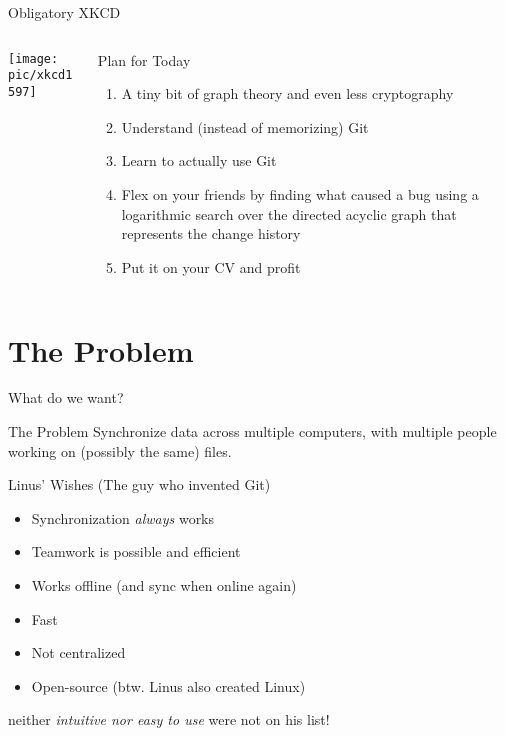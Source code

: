 \documentclass[xetex]{beamer}
\begin{document}
\begin{frame}{Obligatory XKCD}
  \begin{columns}
    \begin{column}{.5\linewidth}
      \texttt{[image: pic/xkcd1597]}
    \end{column}
    \begin{column}{.5\linewidth}
      \begin{alertblock}{Plan for Today}
        \begin{enumerate}
          \item A tiny bit of graph theory and even less cryptography
          \item Understand (instead of memorizing) Git
          \item Learn to actually use Git
          \item Flex on your friends by finding what caused a bug using a
            logarithmic search over the directed acyclic graph that represents
            the change history
          \item Put it on your CV and profit
        \end{enumerate}
      \end{alertblock}
    \end{column}
  \end{columns}
\end{frame}

\section{The Problem}

\begin{frame}{What do we want?}
  \begin{alertblock}{The Problem}
    Synchronize data across multiple computers, with multiple people working on
    (possibly the same) files.
  \end{alertblock}
  \pause

  \begin{block}{Linus' Wishes (The guy who invented Git)}
    \begin{itemize}
      \item Synchronization \emph{always} works
      \item Teamwork is possible and efficient
      \item Works offline (and sync when online again)
      \item Fast
      \item Not centralized
      \item Open-source (btw. Linus also created Linux)
    \end{itemize}
    neither \emph{intuitive nor easy to use} were not on his list!
  \end{block}
\end{frame}
\end{document}
